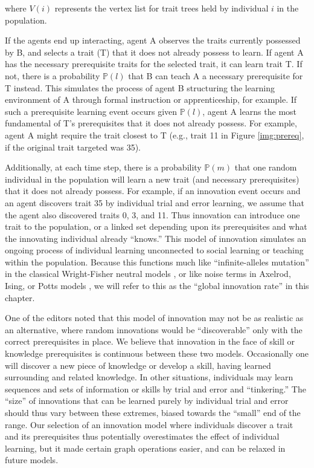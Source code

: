 where $V(i)$ represents the vertex list for trait trees held by
individual $i$ in the population.

If the agents end up interacting, agent A observes the traits currently
possessed by B, and selects a trait (T) that it does not already possess
to learn. If agent A has the necessary prerequisite traits for the
selected trait, it can learn trait T. If not, there is a probability
$\mathbb{P}(l)$ that B can teach A a necessary prerequisite for T
instead. This simulates the process of agent B structuring the learning
environment of A through formal instruction or apprenticeship, for
example. If such a prerequisite learning event occurs given
$\mathbb{P}(l)$, agent A learns the most fundamental of T's
prerequisites that it does not already possess. For example, agent A
might require the trait closest to T (e.g., trait 11 in Figure
\ref{img:prereq}, if the original trait targeted was 35).

Additionally, at each time step, there is a probability $\mathbb{P}(m)$
that one random individual in the population will learn a new trait (and
necessary prerequisites) that it does not already possess. For example,
if an innovation event occurs and an agent discovers trait 35 by
individual trial and error learning, we assume that the agent also
discovered traits 0, 3, and 11. Thus innovation can introduce one trait
to the population, or a linked set depending upon its prerequisites and
what the innovating individual already ``knows.'' This model of
innovation simulates an ongoing process of individual learning
unconnected to social learning or teaching within the population.
Because this functions much like ``infinite-alleles mutation'' in the
classical Wright-Fisher neutral models \citep{Ewens2004}, or like noise
terms in Axelrod, Ising, or Potts models
\citep{castellano2009statistical}, we will refer to this as the ``global
innovation rate'' in this chapter.

One of the editors noted that this model of innovation may not be as
realistic as an alternative, where random innovations would be
``discoverable'' only with the correct prerequisites in place. We
believe that innovation in the face of skill or knowledge prerequisites
is continuous between these two models. Occasionally one will discover a
new piece of knowledge or develop a skill, having learned surrounding
and related knowledge. In other situations, individuals may learn
sequences and sets of information or skills by trial and error and
``tinkering.'' The ``size'' of innovations that can be learned purely by
individual trial and error should thus vary between these extremes,
biased towards the ``small'' end of the range. Our selection of an
innovation model where individuals discover a trait and its
prerequisites thus potentially overestimates the effect of individual
learning, but it made certain graph operations easier, and can be
relaxed in future models.

